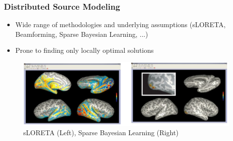\documentclass{beamer}
\begin{document}
\begin{frame}
\frametitle{Distributed Source Modeling}
\begin{itemize}
	\item Wide range of methodologies and underlying assumptions (sLORETA, Beamforming, Sparse Bayesian Learning, ...)
	\item Prone to finding only locally optimal solutions
\end{itemize}
	\begin{figure}
		\includegraphics[width=0.8\linewidth]{image/dsm3}
		\caption{sLORETA (Left), Sparse Bayesian Learning (Right)}
	\end{figure}
\end{frame}
%
%
%
%
%
\end{document}

